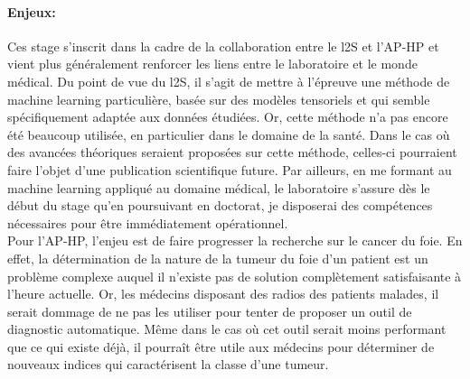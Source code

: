 \documentclass[10pt]{article}
\begin{document}
\paragraph{Enjeux:} Ces stage s'inscrit dans la cadre de la collaboration entre le l2S et l'AP-HP et vient plus généralement renforcer les liens entre le laboratoire et le monde médical. Du point de vue du l2S, il s'agit de mettre à l'épreuve une méthode de machine learning particulière, basée sur des modèles tensoriels et qui semble spécifiquement adaptée aux données étudiées. Or, cette méthode n'a pas encore été beaucoup utilisée, en particulier dans le domaine de la santé. Dans le cas où des avancées théoriques seraient proposées sur cette méthode, celles-ci pourraient faire l'objet d'une publication scientifique future. Par ailleurs, en me formant au machine learning appliqué au domaine médical, le laboratoire s'assure dès le début du stage qu'en poursuivant en doctorat, je disposerai des compétences nécessaires pour être immédiatement opérationnel.\\
\indent Pour l'AP-HP, l'enjeu est de faire progresser la recherche sur le cancer du foie. En effet, la détermination de la nature de la tumeur du foie d'un patient est un problème complexe auquel il n'existe pas de solution complètement satisfaisante à l'heure actuelle. Or, les médecins disposant des radios des patients malades, il serait dommage de ne pas les utiliser pour tenter de proposer un outil de diagnostic automatique. Même dans le cas où cet outil serait moins performant que ce qui existe déjà, il pourraît être utile aux médecins pour déterminer de nouveaux indices qui caractérisent la classe d'une tumeur.
\end{document}
